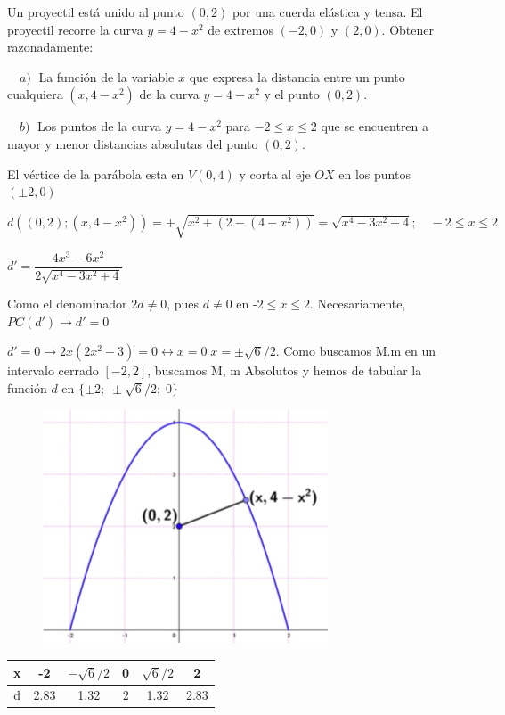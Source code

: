 	\begin{ejre} Un proyectil está unido al punto $(0, 2)$ por una cuerda elástica y tensa. El proyectil recorre la curva $y = 4 -x^2$ de extremos $( -2, 0)$ y $(2, 0)$. Obtener razonadamente:

	$\quad a)\; $ La función de la variable $x$ que expresa la distancia entre un punto cualquiera $(x, 4 -x^2)$ de la curva $y=4-x^2$ y el punto $(0,2)$. 
	
	$\quad b)\; $ Los puntos de la curva $y = 4 -x^2$ para $ - 2 \le  x \le  2$ que se encuentren a mayor y menor distancias absolutas del punto $(0,2)$. 
	\end{ejre}
	
	\begin{proofw}\renewcommand{\qedsymbol}{$\diamond$}

	El vértice de la parábola esta en $V(0,4)$ y corta al eje $OX$ en los puntos $(\pm 2, 0)$
	
	$d\left( (0,2); (x,4-x^2)  \right)= +\sqrt{x^2+(2-(4-x^2))}=\sqrt {x^4-3x^2+4}; \quad -2\le x \le 2$
	 
	 $d'=\dfrac {4x^3-6x^2}{2 \sqrt {x^4-3x^2+4}}$
	 
	 Como el denominador $2d\neq 0$, pues $d\neq 0$ en -$2\le x \le 2$. Necesariamente, $PC(d') \to d'=0$
	
	\begin{multicols}{2}

	$d'=0 \to 2x(2x^2-3)=0 \leftrightarrow x=0 \; x=\pm \sqrt{6}/2$. Como buscamos M.m en un intervalo cerrado $[-2,2]$, buscamos M, m Absolutos y hemos de tabular la función $d$ en $\{\pm 2; \; \pm \sqrt{6}/2; \; 0 \}$
	
	\begin{figure}[H]
	\centering
	\includegraphics[width=.3\textwidth]{imagenes/imagenes05/T05IM23.png}
	\end{figure}
	
	\end{multicols}
	
	\begin{multicols}{2}
	
		
	\begin{table}[H]
	\centering
	\begin{tabular}{|c|c|c|c|c|c|}
	\hline
	 x& -2 & $-\sqrt{6}/2$ & 0 & $\sqrt{6}/2$ & 2 \\ \hline
 	d&  2.83& 1.32 & 2 & 1.32 & 2.83 \\ \hline
	\end{tabular}
	\end{table}	
		

\end{multicols}
\end{proofw}
